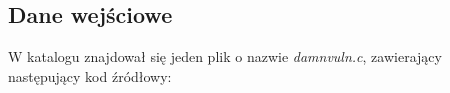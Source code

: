 \subsection{Dane wejściowe}
\label{subsec:dane_wejsciowe_i_oczekiwane_wyniki}
W katalogu znajdował się jeden plik o nazwie \textit{damnvuln.c}, zawierający następujący kod źródłowy:
     
              
              
                  
                      
                          
                                  
